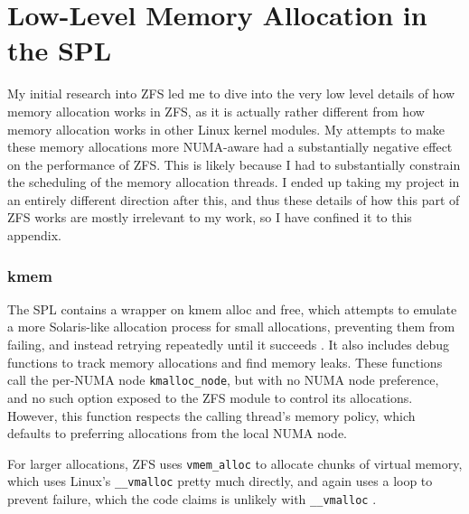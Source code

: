 \chapter{Low-Level Memory Allocation in the SPL}
My initial research into ZFS led me to dive into the very low level details of how memory allocation
works in ZFS, as it is actually rather different from how memory allocation works in other Linux kernel modules.
My attempts to make these memory allocations more NUMA-aware had a substantially negative effect on the performance of ZFS.
This is likely because I had to substantially constrain the scheduling of the memory allocation threads.
I ended up taking my project in an entirely different direction after this, and thus these details of how this part of 
ZFS works are mostly irrelevant to my work, so I have confined it to this appendix.

\subsection{kmem}
The SPL contains a wrapper on kmem alloc and free, which attempts to emulate a more Solaris-like allocation process for small allocations,
preventing them from failing, and instead retrying repeatedly until it succeeds
\cite[{module/spl/spl-kmem.c}]{zfs}.
It also includes debug functions to track memory allocations and find memory leaks.
These functions call the per-NUMA node \texttt{kmalloc\_node}, but with no NUMA node preference, 
and no such option exposed to the ZFS module to control its allocations.
However, this function respects the calling thread's memory policy, which defaults to preferring allocations from the local NUMA node.

For larger allocations, ZFS uses \texttt{vmem\_alloc} to allocate chunks of virtual memory, which uses Linux's \texttt{\_\_vmalloc} pretty much directly, 
and again uses a loop to prevent failure, which the code claims is unlikely with \texttt{\_\_vmalloc} \cite[{module/spl/spl-kmem.c}]{zfs}.

